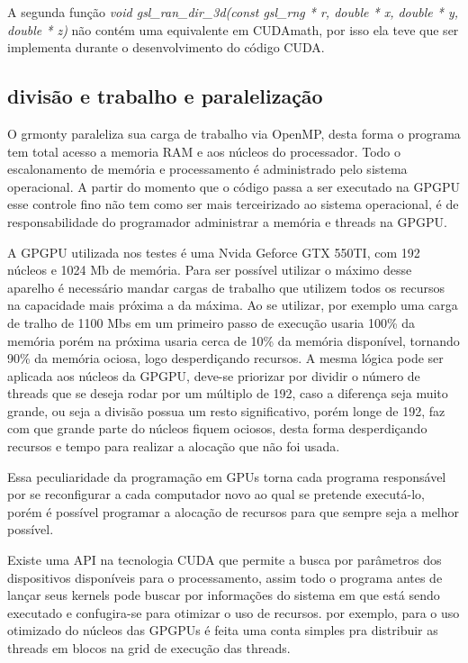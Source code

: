     A segunda função \textit{void gsl\_ran\_dir\_3d(const gsl\_rng * r, double * x, double * y, double * z)} não contém uma equivalente em CUDAmath, por isso ela teve que ser implementa durante o desenvolvimento do código CUDA.


  \subsection{divisão e trabalho e paralelização}
    O grmonty paraleliza sua carga de trabalho via OpenMP, desta forma o programa tem total acesso a memoria RAM e aos núcleos do processador. Todo o escalonamento de memória e processamento é administrado pelo sistema operacional. A partir do momento que o código passa a ser executado na GPGPU esse controle fino não tem como ser mais terceirizado ao sistema operacional, é de responsabilidade do programador administrar a memória e threads na GPGPU.

    A GPGPU utilizada nos testes é uma Nvida Geforce GTX 550TI, com 192 núcleos e 1024 Mb de memória. Para ser possível utilizar o máximo desse aparelho é necessário mandar cargas de trabalho que utilizem todos os recursos na capacidade mais próxima a da máxima. Ao se utilizar, por exemplo uma carga de tralho de 1100 Mbs em um primeiro passo de execução usaria 100\% da memória porém na próxima usaria cerca de 10\% da memória disponível, tornando 90\% da memória ociosa, logo desperdiçando recursos. A mesma lógica pode ser aplicada aos núcleos da GPGPU, deve-se priorizar por dividir o número de threads que se deseja rodar por um múltiplo de 192, caso a diferença seja muito grande, ou seja a divisão possua um resto significativo, porém longe de 192, faz com que grande parte do núcleos fiquem ociosos, desta forma desperdiçando recursos e tempo para realizar a alocação que não foi usada.

    Essa peculiaridade da programação em GPUs torna cada programa responsável por se reconfigurar a cada computador novo ao qual se pretende executá-lo, porém é possível programar a alocação de recursos para que sempre seja a melhor possível.

    Existe uma API na tecnologia CUDA que permite a busca por parâmetros dos dispositivos disponíveis para o processamento, assim todo o programa antes de lançar seus kernels pode buscar por informações do sistema em que está sendo executado e confugira-se para otimizar o uso de recursos. por exemplo, para o uso otimizado do núcleos das GPGPUs é feita uma conta simples pra distribuir as threads em blocos na grid de execução das threads.

